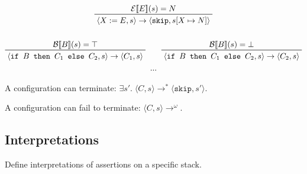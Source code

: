 \documentclass[a4paper, 11pt]{article}
\newcommand{\interp}[2][]{\mathcal{#1}[\![#2]\!]}
\begin{document}
{{        \begin{gather*}
        \prftree[r]{}
        {\interp[E]{E}(s) = N}
        {\langle X:=E , s \rangle \rightarrow \langle \texttt{skip} , s[X \mapsto N] \rangle}
        \\
        \\
        \prftree[r]{}
        {\interp[B]{B}(s) = \top}
        {\langle \texttt{if }B\texttt{ then }C_1\texttt{ else }C_2, s \rangle \rightarrow \langle C_1 , s \rangle}
        \qquad
        \prftree[r]{}
        {\interp[B]{B}(s) = \bot}
        {\langle \texttt{if }B\texttt{ then }C_1\texttt{ else }C_2, s \rangle \rightarrow \langle C_2 , s \rangle}
        \\
        ...
        \end{gather*}

        A configuration can terminate: \(\exists s'.\; \langle C,s \rangle \rightarrow^* \langle \texttt{skip},s' \rangle\).

        A configuration can fail to terminate: \(\langle C,s \rangle \rightarrow^\omega\).
    }
    \subsection*{Interpretations}
    {
        Define interpretations of assertions on a specific stack.
        
}}
\end{document}
